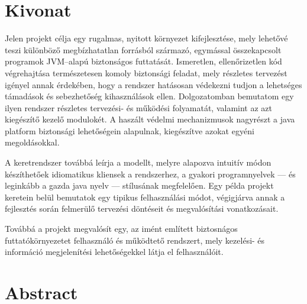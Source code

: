 
%

\begin{otherlanguage}{hungarian}
\chapter*{Kivonat}

Jelen projekt célja egy rugalmas, nyitott környezet kifejlesztése, mely lehetővé teszi különböző megbízhatatlan forrásból származó, egymással összekapcsolt programok JVM--alapú biztonságos futtatását. Ismeretlen, ellenőrizetlen kód végrehajtása természetesen komoly biztonsági feladat, mely részletes tervezést igényel annak érdekében, hogy a rendszer hatásosan védekezni tudjon a lehetséges támadások és sebezhetőség kihasználások ellen. Dolgozatomban bemutatom egy ilyen rendszer részletes tervezési- és működési folyamatát, valamint az azt kiegészítő kezelő modulokét. A haszált védelmi mechanizmusok nagyrészt a java platform biztonsági lehetőségein alapulnak, kiegészítve azokat egyéni megoldásokkal.

A keretrendszer továbbá leírja a modellt, melyre alapozva intuitív módon készíthetőek idiomatikus kliensek a rendszerhez, a gyakori programnyelvek --- és leginkább a gazda java nyelv --- stílusának megfelelően. Egy példa projekt keretein belül bemutatok egy tipikus felhasználási módot, végigjárva annak a fejlesztés során felmerülő tervezési döntéseit és megvalósítási vonatkozásait. 

Továbbá a projekt megvalósít egy, az imént említett biztosnágos futtatókörnyezetet felhasználó és működtető rendszert, mely kezelési- és információ megjelenítési lehetőségekkel látja el felhasználóit. 

\end{otherlanguage}

\chapter*{Abstract}

